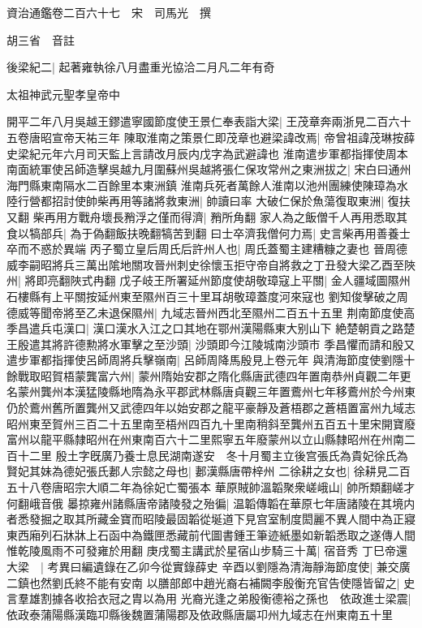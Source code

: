 資治通鑑卷二百六十七　宋　司馬光　撰

胡三省　音註

後梁紀二|{
	起著雍執徐八月盡重光協洽二月凡二年有奇}


太祖神武元聖孝皇帝中

開平二年八月吳越王鏐遣寧國節度使王景仁奉表詣大梁|{
	王茂章奔兩浙見二百六十五卷唐昭宣帝天祐三年}
陳取淮南之策景仁即茂章也避梁諱改焉|{
	帝曾祖諱茂琳按薛史梁紀元年六月司天監上言請改月辰内戊字為武避諱也}
淮南遣步軍都指揮使周本南面統軍使呂師造擊吳越九月圍蘇州吳越將張仁保攻常州之東洲拔之|{
	宋白曰通州海門縣東南隔水二百餘里本東洲鎮}
淮南兵死者萬餘人淮南以池州團練使陳璋為水陸行營都招討使帥柴再用等諸將救東洲|{
	帥讀曰率}
大破仁保於魚蕩復取東洲|{
	復扶又翻}
柴再用方戰舟壞長矟浮之僅而得濟|{
	矟所角翻}
家人為之飯僧千人再用悉取其食以犒部兵|{
	為于偽翻飯扶晚翻犒苦到翻}
曰士卒濟我僧何力焉|{
	史言柴再用善養士卒而不惑於異端}
丙子蜀立皇后周氏后許州人也|{
	周氏蓋蜀主建糟糠之妻也}
晉周德威李嗣昭將兵三萬出隂地關攻晉州刺史徐懷玉拒守帝自將救之丁丑發大梁乙酉至陜州|{
	將即亮翻陜式冉翻}
戊子岐王所署延州節度使胡敬璋寇上平關|{
	金人疆域圖隰州石樓縣有上平關按延州東至隰州百三十里耳胡敬璋蓋度河來寇也}
劉知俊擊破之周德威等聞帝將至乙未退保隰州|{
	九域志晉州西北至隰州二百五十五里}
荆南節度使高季昌遣兵屯漢口|{
	漢口漢水入江之口其地在鄂州漢陽縣東大别山下}
絶楚朝貢之路楚王殷遣其將許德勲將水軍擊之至沙頭|{
	沙頭即今江陵城南沙頭市}
季昌懼而請和殷又遣步軍都指揮使呂師周將兵擊嶺南|{
	呂師周降馬殷見上卷元年}
與清海節度使劉隱十餘戰取昭賀梧蒙龔富六州|{
	蒙州隋始安郡之隋化縣唐武德四年置南恭州貞觀二年更名蒙州龔州本漢猛陵縣地隋為永平郡武林縣唐貞觀三年置鷰州七年移鷰州於今州東仍於鷰州舊所置龔州又武德四年以始安郡之龍平豪靜及蒼梧郡之蒼梧置富州九域志昭州東至賀州三百二十五里南至梧州四百九十里南稍斜至龔州五百五十里宋開寶廢富州以龍平縣隸昭州在州東南百六十二里熙寧五年廢蒙州以立山縣隸昭州在州南二百十二里}
殷土字旣廣乃養士息民湖南遂安　冬十月蜀主立後宫張氏為貴妃徐氏為賢妃其妹為德妃張氏郪人宗懿之母也|{
	郪漢縣唐帶梓州}
二徐耕之女也|{
	徐耕見二百五十八卷唐昭宗大順二年為徐妃亡蜀張本}
華原賊帥溫韜聚衆嵯峨山|{
	帥所類翻嵯才何翻峨音俄}
㬥掠雍州諸縣唐帝諸陵發之殆徧|{
	温韜傳韜在華原七年唐諸陵在其境内者悉發掘之取其所藏金寶而昭陵最固韜從埏道下見宫室制度閎麗不異人間中為正寢東西廂列石牀牀上石函中為鐵匣悉藏前代圖書鍾王筆迹紙墨如新韜悉取之遂傳人間惟乾陵風雨不可發雍於用翻}
庚戌蜀主講武於星宿山步騎三十萬|{
	宿音秀}
丁巳帝還大梁　|{
	考異曰編遺錄在乙卯今從實錄薛史}
辛酉以劉隱為清海靜海節度使|{
	兼交廣二鎮也然劉氏終不能有安南}
以膳部郎中趙光裔右補闕李殷衡充官告使隱皆留之|{
	史言羣雄割據各收拾衣冠之胄以為用}
光裔光逢之弟殷衡德裕之孫也　依政進士梁震|{
	依政泰蒲陽縣漢臨卭縣後魏置蒲陽郡及依政縣唐屬卭州九域志在州東南五十里}
